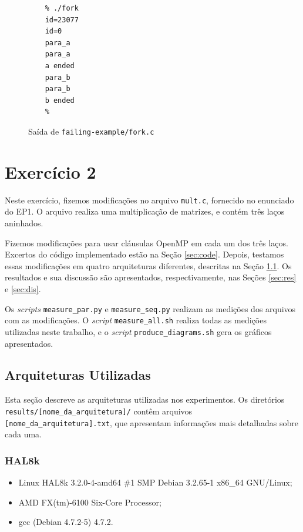 \documentclass[a4paper, 12pt]{article}
\begin{document}
\begin{figure}[H]
    \centering
    \begin{lstlisting}
    % ./fork
    id=23077
    id=0
    para_a
    para_a
    a ended
    para_b
    para_b
    b ended
    %
    \end{lstlisting}
    \caption{Saída de \texttt{failing-example/fork.c}}
    \label{fig:fork_out}
\end{figure}

\section{Exercício 2} \label{sec:ex2}

Neste exercício, fizemos modificações no arquivo \texttt{mult.c}, fornecido
no enunciado do EP1. O arquivo realiza uma multiplicação de matrizes,
e contém três laços aninhados.

Fizemos modificações para usar cláusulas OpenMP em cada um dos três laços.
Excertos do código implementado estão na Seção \ref{sec:code}. Depois,
testamos essas modificações em quatro arquiteturas diferentes, descritas
na Seção \ref{sec:arch}. Os resultados e sua discussão são apresentados,
respectivamente, nas Seções \ref{sec:res} e \ref{sec:dis}.

Os \textit{scripts} \texttt{measure\_par.py} e \texttt{measure\_seq.py}
realizam as medições dos arquivos com as modificações. O \textit{script}
\texttt{measure\_all.sh} realiza todas as medições utilizadas neste trabalho,
e o \textit{script} \texttt{produce\_diagrams.sh} gera os gráficos
apresentados.

\subsection{Arquiteturas Utilizadas} \label{sec:arch}

Esta seção descreve as arquiteturas utilizadas nos experimentos.
Os diretórios \texttt{results/[nome\_da\_arquitetura]/} contêm arquivos
\texttt{[nome\_da\_arquitetura].txt}, que apresentam informações mais
detalhadas sobre cada uma.

\subsubsection{HAL8k}

\begin{itemize}
    \item Linux HAL8k 3.2.0-4-amd64 \#1 SMP Debian 3.2.65-1 x86\_64 GNU/Linux;
    \item AMD FX(tm)-6100 Six-Core Processor;
    \item gcc (Debian 4.7.2-5) 4.7.2.
\end{itemize}
\end{document}
